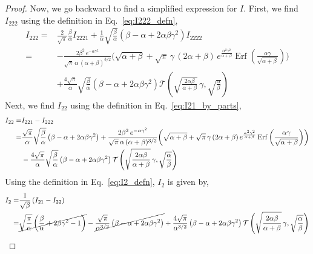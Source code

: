 \documentclass[journal]{IEEEtran}
\theoremstyle{plain}
\theoremstyle{definition}
\theoremstyle{remark}
\newcommand{\Ot}{\mathcal{T}}
\newcommand{\Erf}{\operatorname{Erf}}
\begin{document}
\begin{proof}
Now, we go backward to find a simplified expression for $I$. First, we find $I_{222}$ using the definition in Eq.~\eqref{eq:I222_defn},
\begin{equation}
\begin{split}
    I_{222} =& \frac{2}{\sqrt{\pi}}  \frac{\beta}{\alpha} I_{2221} + \frac{1}{\alpha} \sqrt{\frac{\beta }{\alpha }} \left(\beta - \alpha  + 2 \alpha\beta \gamma ^2 \right) I_{2222} \\
    =& -\frac{2 \beta^2 \, e^{-\alpha  \gamma ^2} }{\sqrt{\pi} \, \alpha \, (\alpha +\beta )^{3/2}} \biggl(\sqrt{\alpha +\beta } +\sqrt{\pi } \,\gamma \, (2 \alpha +\beta ) \, e^{\frac{\alpha ^2 \gamma ^2}{\alpha +\beta }} \Erf\left(\frac{\alpha  \gamma }{\sqrt{\alpha +\beta }}\right)\biggr) \\&+ \frac{4 \sqrt{\pi}}{\alpha} \sqrt{\frac{\beta }{\alpha }} \left(\beta - \alpha  + 2 \alpha\beta \gamma ^2 \right) \Ot\left(\sqrt{\frac{2 \alpha \beta}{\alpha + \beta}} \, \gamma, \sqrt{\frac{\alpha}{\beta}}\right)
\end{split}
\end{equation}
Next, we find $I_{22}$ using the definition in Eq.~\eqref{eq:I21_by_parts},
\begin{equation}
\begin{split}
    I_{22} =& I_{221} - I_{222} \\
    =& \frac{\sqrt{\pi}}{\alpha} \sqrt{\frac{\beta }{\alpha }} \left(\beta - \alpha  +2 \alpha\beta \gamma ^2 \right) + \frac{2 \beta^2 \, e^{-\alpha  \gamma ^2} }{\sqrt{\pi} \, \alpha \, (\alpha +\beta )^{3/2}} \biggl(\sqrt{\alpha +\beta } +\sqrt{\pi } \,\gamma \, (2 \alpha +\beta ) \, e^{\frac{\alpha ^2 \gamma ^2}{\alpha +\beta }} \Erf\left(\frac{\alpha  \gamma }{\sqrt{\alpha +\beta }}\right)\biggr) \\&- \frac{4 \sqrt{\pi}}{\alpha} \sqrt{\frac{\beta }{\alpha }} \left(\beta - \alpha  + 2 \alpha\beta \gamma ^2 \right) \Ot\left(\sqrt{\frac{2 \alpha \beta}{\alpha + \beta}} \, \gamma, \sqrt{\frac{\alpha}{\beta}}\right)
\end{split}
\raisetag{30pt}
\end{equation}
Using the definition in Eq.~\eqref{eq:I2_defn}, $I_2$ is given by,
\begin{equation}
\begin{split}
    I_2 =& \frac{1}{\sqrt{\beta}} \left(I_{21} - I_{22}\right) \\
    =& \cancel{\sqrt{\frac{\pi}{\alpha}} \left(\frac{\beta}{\alpha} + 2 \beta \gamma^2 - 1 \right)} - \cancel{\frac{\sqrt{\pi}}{\alpha^{3/2}}  \left(\beta - \alpha  + 2 \alpha\beta \gamma ^2 \right)} + \frac{4 \sqrt{\pi}}{\alpha^{3/2}}  \left(\beta - \alpha  + 2 \alpha\beta \gamma ^2 \right) \Ot\left(\sqrt{\frac{2 \alpha \beta}{\alpha + \beta}} \, \gamma, \sqrt{\frac{\alpha}{\beta}}\right) \\

\end{split}
\end{equation}
\end{proof}
\end{document}
